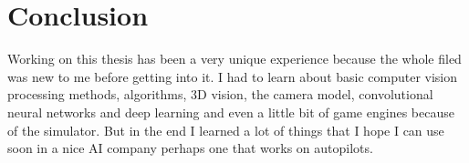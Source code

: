 \chapter{Conclusion}
\label{chap:conclusion}



Working on this thesis has been a very unique experience because the whole filed
was new to me before getting into it. I had to learn about basic computer vision
processing methods, algorithms, 3D vision, the camera model, convolutional
neural networks and deep learning and even a little bit of game engines because
of the simulator. But in the end I learned a lot of things that I hope I can use
soon in a nice AI company perhaps one that works on autopilots.

